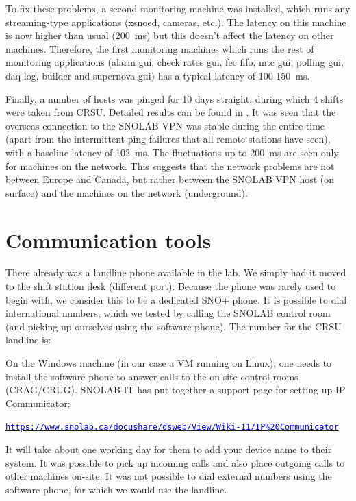 \documentclass[a4paper,10pt]{article}
\newcommand{\link}[1]{\href{#1}{\textcolor{blue}{\texttt{#1}}}} %
\begin{document}
To fix these problems, a second monitoring machine was installed, which runs any streaming-type applications (xsnoed, cameras, etc.). The latency on this machine is now higher than usual (200~ms) but this doesn't affect the latency on other machines. Therefore, the first monitoring machines which runs the rest of monitoring applications (alarm gui, check rates gui, fec fifo, mtc gui, polling gui, daq log, builder and supernova gui) has a typical latency of 100-150~ms.

Finally, a number of hosts was pinged for 10 days straight, during which 4 shifts were taken from CRSU. Detailed results can be found in . It was seen that the overseas connection to the SNOLAB VPN was stable during the entire time (apart from the intermittent ping failures that all remote stations have seen), with a baseline latency of 102~ms. The fluctuations up to 200~ms are seen only for machines on the network. This suggests that the network problems are not between Europe and Canada, but rather between the SNOLAB VPN host (on surface) and the machines on the network (underground).


\section{Communication tools}
There already was a landline phone available in the lab. We simply had it moved to the shift station desk (different port).
Because the phone was rarely used to begin with, we consider this to be a dedicated SNO+ phone.
It is possible to dial international numbers, which we tested by calling the SNOLAB control room (and picking up ourselves using the software phone).
The number for the CRSU landline is:


On the Windows machine (in our case a VM running on Linux), one needs to install the software phone to answer calls to the on-site control rooms (CRAG/CRUG). SNOLAB IT has put together a support page for setting up IP Communicator:

\qquad\link{https://www.snolab.ca/docushare/dsweb/View/Wiki-11/IP\%20Communicator}

It will take about one working day for them to add your device name to their system. It was possible to pick up incoming calls and also place outgoing calls to other machines on-site. It was not possible to dial external numbers using the software phone, for which we would use the landline.
\end{document}
